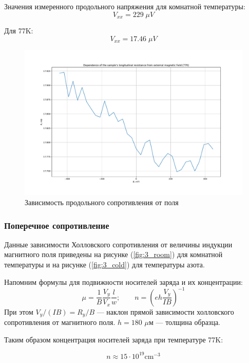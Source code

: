 \documentclass[a4paper, 12pt]{article}
\begin{document}
Значения измеренного продольного напряжения для комнатной температуры:
$$V_{xx} = 229 \; \mu V  $$

Для 77K:
$$V_{xx} = 17.46 \; \mu V $$

\begin{figure}[H]
	\centering
	\includegraphics[width=\linewidth]{3_longitudunal.pdf}
	\caption{Зависимость продольного сопротивления от поля}
	\label{fig:3_long}
\end{figure}

\subsubsection{Поперечное сопротивление}

Данные зависимости Холловского сопротивления от величины индукции магнитного поля приведены на рисунке (\ref{fig:3_room}) для комнатной температуры и на рисунке (\ref{fig:3_cold}) для температуры азота.

Напомним формулы для подвижности носителей заряда и их концентрации:
$$\mu=\frac{1}{B}\frac{V_y}{V_x}\frac{l}{w}; \qquad n=\left(eh\frac{V_y}{IB}\right)^{-1}  $$
При этом $V_y/(IB) = R_y/B$ --- наклон прямой зависимости холловского сопротивления от магнитного поля. $h = 180$ $\mu$м --- толщина образца.

Таким образом концентрация носителей заряда при температуре 77K:

$$n\approx15 \cdot 10^{19}\text{cm}^{-3}$$ 
\end{document}
